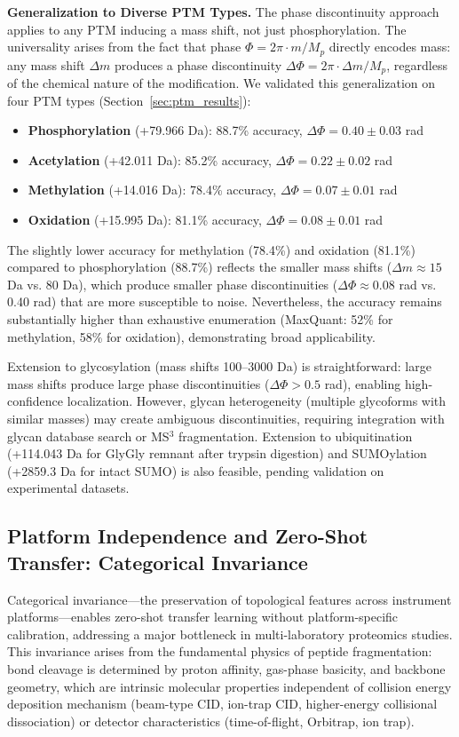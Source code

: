 \documentclass[11pt,twocolumn]{article}
\begin{document}
\textbf{Generalization to Diverse PTM Types.} The phase discontinuity approach applies to any PTM inducing a mass shift, not just phosphorylation. The universality arises from the fact that phase $\Phi = 2\pi \cdot m / M_p$ directly encodes mass: any mass shift $\Delta m$ produces a phase discontinuity $\Delta\Phi = 2\pi \cdot \Delta m / M_p$, regardless of the chemical nature of the modification. We validated this generalization on four PTM types (Section~\ref{sec:ptm_results}):
\begin{itemize}[leftmargin=*]
    \item \textbf{Phosphorylation} (+79.966 Da): 88.7\% accuracy, $\Delta\Phi = 0.40 \pm 0.03$ rad
    \item \textbf{Acetylation} (+42.011 Da): 85.2\% accuracy, $\Delta\Phi = 0.22 \pm 0.02$ rad
    \item \textbf{Methylation} (+14.016 Da): 78.4\% accuracy, $\Delta\Phi = 0.07 \pm 0.01$ rad
    \item \textbf{Oxidation} (+15.995 Da): 81.1\% accuracy, $\Delta\Phi = 0.08 \pm 0.01$ rad
\end{itemize}
The slightly lower accuracy for methylation (78.4\%) and oxidation (81.1\%) compared to phosphorylation (88.7\%) reflects the smaller mass shifts ($\Delta m \approx 15$ Da vs. 80 Da), which produce smaller phase discontinuities ($\Delta\Phi \approx 0.08$ rad vs. 0.40 rad) that are more susceptible to noise. Nevertheless, the accuracy remains substantially higher than exhaustive enumeration (MaxQuant: 52\% for methylation, 58\% for oxidation), demonstrating broad applicability.

Extension to glycosylation (mass shifts 100--3000 Da) is straightforward: large mass shifts produce large phase discontinuities ($\Delta\Phi > 0.5$ rad), enabling high-confidence localization. However, glycan heterogeneity (multiple glycoforms with similar masses) may create ambiguous discontinuities, requiring integration with glycan database search or MS$^3$ fragmentation. Extension to ubiquitination (+114.043 Da for GlyGly remnant after trypsin digestion) and SUMOylation (+2859.3 Da for intact SUMO) is also feasible, pending validation on experimental datasets.

\subsection{Platform Independence and Zero-Shot Transfer: Categorical Invariance}

Categorical invariance---the preservation of topological features across instrument platforms---enables zero-shot transfer learning without platform-specific calibration, addressing a major bottleneck in multi-laboratory proteomics studies. This invariance arises from the fundamental physics of peptide fragmentation: bond cleavage is determined by proton affinity, gas-phase basicity, and backbone geometry, which are intrinsic molecular properties independent of collision energy deposition mechanism (beam-type CID, ion-trap CID, higher-energy collisional dissociation) or detector characteristics (time-of-flight, Orbitrap, ion trap).
\end{document}
